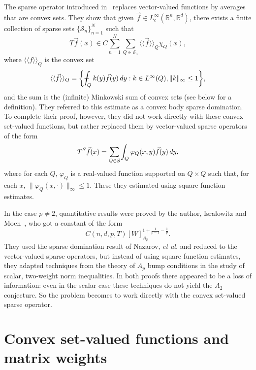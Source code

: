\documentclass[12pt]{amsart}
\theoremstyle{definition}
\theoremstyle{remark}
\numberwithin{equation}{section}
\newcommand{\rn}{{{\mathbb R}^n}}
\newcommand{\rd}{{{\mathbb R}^d}}
\newcommand{\Ss}{\mathcal S}
\newcommand{\vecf}{\vec{f}}
\def\Xint#1{\mathchoice
   {\XXint\displaystyle\textstyle{#1}}%
   {\XXint\textstyle\scriptstyle{#1}}%
   {\XXint\scriptstyle\scriptscriptstyle{#1}}%
   {\XXint\scriptscriptstyle\scriptscriptstyle{#1}}%
   \!\int}
\def\XXint#1#2#3{{\setbox0=\hbox{$#1{#2#3}{\int}$}
     \vcenter{\hbox{$#2#3$}}\kern-.5\wd0}}
\def\avgint{\Xint-}
\begin{document}
The sparse operator introduced in~\cite{MR3689742} replaces
vector-valued functions by averages that are convex sets.  They show
that given $\vecf \in L_c^\infty(\rn,\rd)$, there exists a finite
collection of sparse sets  $\{\Ss_n\}_{n=1}^N$ such that
%
%
\begin{equation} \label{eqn:nptv1}
 T{\vecf}(x) \in C\sum_{n=1}^N\sum_{Q\in \Ss_n}
  \langle\langle{\vecf}\rangle\rangle_Q \chi_Q(x), 
\end{equation}
% 
where $\langle\langle{f}\rangle\rangle_Q$ is the convex set
%
\[  \langle\langle{\vecf}\rangle\rangle_Q
  = \bigg\{ \avgint_Q k(y) {\vecf}(y)\,dy : k \in L^\infty(Q),
  \|k\|_\infty \leq 1 \bigg\},  \]
and the sum is the (infinite) Minkowski
sum of convex sets (see below for a definition).   They referred to this estimate as a convex body
sparse domination.  To complete their proof, however, they did not
work directly with these convex set-valued functions, but rather
replaced them by vector-valued sparse operators of the form
%
\[ T^S {\vecf}(x) = \sum_{Q\in \Ss} \avgint_Q
  \varphi_Q(x,y){\vecf}(y)\,dy, \]
%
where for each $Q$, $\varphi_Q$ is a real-valued function supported on
$Q\times Q$  such that, for each $x$,
$\|\varphi_Q(x,\cdot)\|_\infty \leq 1$.
%
These they estimated using square function estimates.

In the case $p\neq 2$,  quantitative
results were proved by  the author,
Isralowitz and Moen~\cite{MR3803292}, who got a constant of the form
%
\[ C(n,d,p,T)[W]_{A_p}^{1+\frac{1}{p-1}-\frac{1}{p}}.  \]
%
They used the sparse domination result of Nazarov, {\em et al.} and
reduced to the vector-valued sparse operators, but
instead of using square function estimates, they adapted techniques from the
theory of $A_p$ bump conditions in the study of scalar, two-weight
norm inequalities.  In both proofs there appeared to be a loss of information:
even in the scalar case these techniques do not yield the $A_2$
conjecture.  So the problem becomes to work directly with the convex
set-valued sparse operator.

\section{Convex set-valued functions and matrix weights}
\label{section:convex}
\end{document}

